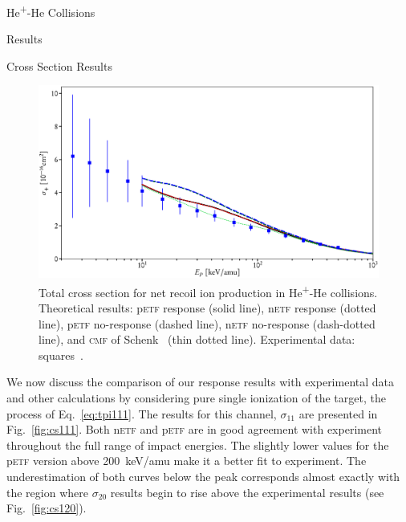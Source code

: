 \documentclass[letterpaper, 11 pt]{report}
\begin{document}
\begin{chapter}{\texorpdfstring{He\textsuperscript{+}}{He+}-He Collisions \label{chap:hephe}}
\begin{section}{Results \label{sec:hephe-disc}}
\begin{subsection}{Cross Section Results \label{sec:hephe-res}}
         \begin{figure}[t]
            \centering
            \includegraphics[width = \linewidth]{./images/hephe-cross/netRecoil.eps}
            \caption[Total cross section for net recoil ion production in He\textsuperscript{+}-He
                     collisions.]
                    {Total cross section for net recoil ion production in He\textsuperscript{+}-He
                     collisions.
                     Theoretical results: p\textsc{etf} response (solid line), n\textsc{etf} response
                                          (dotted line), p\textsc{etf} no-response (dashed line),
                                          n\textsc{etf} no-response (dash-dotted line), and
                                          \textsc{cmf} of Schenk~\cite{geraldDiss}
                                          (thin dotted line).
                     Experimental data: squares~\cite{RGID85}. \label{fig:recoil}}
         \end{figure}

         We now discuss the comparison of our response results with experimental data and other
         calculations by considering pure single ionization of the target, the process of
         Eq.~\eqref{eq:tpi111}. The results for this channel, $\sigma_{11}$ are presented in
         Fig.~\ref{fig:cs111}. Both n\textsc{etf} and p\textsc{etf} are in good agreement with
         experiment throughout the full range of impact energies. The slightly lower values for the
         p\textsc{etf} version above 200~keV/amu make it a better fit to experiment. The underestimation
         of both curves below the peak corresponds almost exactly with the region where $\sigma_{20}$
         results begin to rise above the experimental results (see Fig.~\ref{fig:cs120}).


\end{subsection}
\end{section}
\end{chapter}
\end{document}
